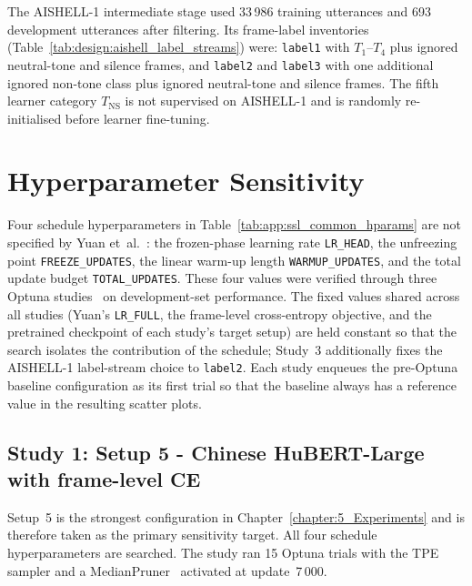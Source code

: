 The AISHELL-1 intermediate stage used 33\,986 training utterances and 693
development utterances after filtering. Its frame-label inventories
(Table~\ref{tab:design:aishell_label_streams}) were:
\texttt{label1} with \(T_1\)--\(T_4\) plus ignored neutral-tone and silence
frames, and \texttt{label2} and \texttt{label3} with one additional ignored
non-tone class plus ignored neutral-tone and silence frames. The fifth learner
category \(T_{\mathrm{NS}}\) is not supervised on AISHELL-1 and is randomly
re-initialised before learner fine-tuning.

\section{Hyperparameter Sensitivity}
\label{sec:app:sensitivity}

Four schedule hyperparameters in Table~\ref{tab:app:ssl_common_hparams} are
not specified by Yuan et~al.~\cite{yuan2023}: the frozen-phase learning rate
\texttt{LR\_HEAD}, the unfreezing point \texttt{FREEZE\_UPDATES}, the linear
warm-up length \texttt{WARMUP\_UPDATES}, and the total update budget
\texttt{TOTAL\_UPDATES}. These four values were verified through three
Optuna studies~\cite{akiba2019optuna} on development-set performance. The
fixed values shared across all studies (Yuan's \texttt{LR\_FULL}, the
frame-level cross-entropy objective, and the pretrained checkpoint of each
study's target setup) are held constant so that the search isolates the
contribution of the schedule; Study~3 additionally fixes the AISHELL-1
label-stream choice to \texttt{label2}. Each study enqueues the pre-Optuna
baseline configuration as its first trial so that the baseline always has a
reference value in the resulting scatter plots.

\subsection{Study 1: Setup 5 - Chinese HuBERT-Large with frame-level CE}
\label{sec:app:sensitivity:hubert}

Setup~5 is the strongest configuration in Chapter~\ref{chapter:5_Experiments}
and is therefore taken as the primary sensitivity target. All four schedule
hyperparameters are searched. The study ran 15 Optuna trials with the
TPE sampler and a MedianPruner~\cite{akiba2019optuna} activated at update~7\,000.

